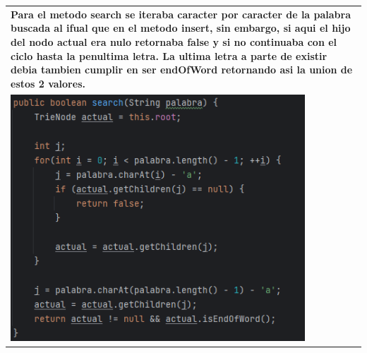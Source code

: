 \documentclass[9pt]{article}
\begin{document}
\begin{longtable}{|p{15cm}|}
		\textbf{Para el metodo search se iteraba caracter por caracter de la palabra buscada
		al ifual que en el metodo insert, sin embargo, si aqui el hijo del nodo actual era nulo
		retornaba false y si no continuaba con el ciclo hasta la penultima letra. La ultima letra
		a parte de existir debia tambien cumplir en ser endOfWord retornando asi la union de estos
		2 valores.}\\
		\includegraphics[width=0.85\textwidth,keepaspectratio]{img/search.png}\\


\end{longtable}
\end{document}

